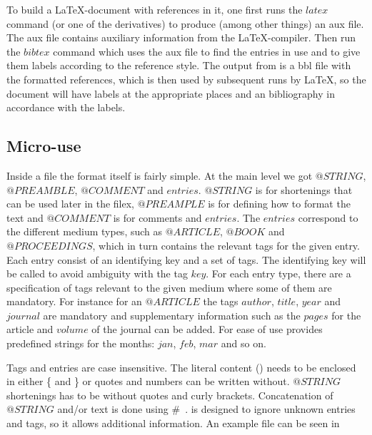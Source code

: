 To build a {\LaTeX}-document with {\bibtex} references in it, one
first runs the $latex$ command (or one of the derivatives) to produce
(among other things) an aux file.  The aux file contains auxiliary
information from the {\LaTeX}-compiler.  Then run the $bibtex$ command
which uses the aux file to find the entries in use and to give them
labels according to the reference style.  The output from {\bibtex} is
a bbl file with the formatted references, which is then used by
subsequent runs by {\LaTeX}, so the document will have labels at the
appropriate places and an bibliography in accordance with the labels.


\subsection{Micro-use}

Inside a {\bibtex} file the format itself is fairly simple. At the
main level we got $@STRING$, $@PREAMBLE$, $@COMMENT$ and $entries$.
$@STRING$ is for shortenings that can be used later in the {\bibtex}
filex, $@PREAMPLE$ is for defining how to format the text and
$@COMMENT$ is for comments and $entries$.  The $entries$ correspond to
the different medium types, such as $@ARTICLE$, $@BOOK$ and
$@PROCEEDINGS$, which in turn contains the relevant tags for the given
entry.  Each entry consist of an identifying key and a set of tags.
The identifying key will be called  to avoid
ambiguity with the tag $key$.  For each entry type, there are a
specification of tags relevant to the given medium where some of them
are mandatory. For instance for an $@ARTICLE$ the tags $author$,
$title$, $year$ and $journal$ are mandatory and supplementary
information such as the $pages$ for the article and $volume$ of the
journal can be added.  For ease of use {\bibtex} provides predefined
strings for the months: $jan$, $feb$, $mar$ and so on.

Tags and entries are case insensitive. The literal content
() needs to be enclosed in either \{ and \} or quotes and
numbers can be written without.  $@STRING$ shortenings has to be
without quotes and curly brackets.  Concatenation of $@STRING$ and/or
text is done using \#~\cite{bibtex_resource}.  {\bibtex} is designed
to ignore unknown entries and tags, so it allows additional
information.  An example {\bibtex} file can be seen in

